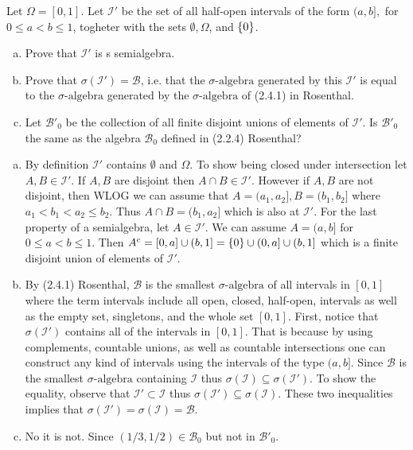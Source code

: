 \begin{problem}
	Let $ \Omega = [0,1] $. Let $ \mathcal{I}' $ be the set of all half-open intervals of the form $ (a,b], $ for $ 0\leq a < b \leq 1 $, togheter with the sets $ \emptyset, \Omega $, and $ \{0\} $.
	\begin{enumerate}[(a)]
		\item Prove that $ \mathcal{I}' $ is s semialgebra. 
		\item Prove that $ \sigma(\mathcal{I}') = \mathcal{B} $, i.e. that the $\sigma\text{-algebra}$ generated by this $ \mathcal{I}' $ is equal to the $\sigma\text{-algebra}$ generated by the $\sigma\text{-algebra}$ of (2.4.1) in Rosenthal.
		\item Let $ \mathcal{B}'_0 $ be the collection of all finite disjoint unions of elements of $ \mathcal{I}' $. Is $ \mathcal{B}'_0 $ the same as the algebra $ \mathcal{B}_0 $ defined in (2.2.4) Rosenthal?
	\end{enumerate}
\end{problem}
\begin{solution}
	\begin{enumerate}[(a)]
		\item By definition $ \mathcal{I}' $ contains $ \emptyset $ and $ \Omega $. To show being closed under intersection let $ A, B \in \mathcal{I}' $. If $ A,B $  are disjoint then $ A\cap B \in \mathcal{I'} $. However if $ A,B $ are not disjoint, then WLOG we can assume that $ A=(a_1,a_2], B = (b_1,b_2] $ where $ a_1 < b_1 < a_2 \leq b_2 $. Thus $ A\cap B = (b_1,a_2] $ which is also at $ \mathcal{I'} $. For the last property of a semialgebra, let $ A \in \mathcal{I'} $. We can assume $ A = (a,b] $ for $ 0\leq a<b \leq 1 $. Then $ A^c = [0,a] \cup (b,1] = \{0\}\cup (0,a] \cup (b,1] $ which is a finite disjoint union of elements of $ \mathcal{I'} $.
		\item By (2.4.1) Rosenthal, $ \mathcal{B} $ is the smallest $\sigma\text{-algebra}$ of all intervals in $ [0,1] $ where the term intervals include all open, closed, half-open, intervals as well as the empty set, singletons, and the whole set $ [0,1] $. First, notice that $ \sigma(\mathcal{I'}) $ contains all of the intervals in $ [0,1] $. That is because by using complements, countable unions, as well as countable intersections one can construct any kind of intervals using the intervals of the type $ (a,b] $. Since $ \mathcal{B} $ is the smallest $\sigma\text{-algebra}$ containing $ \mathcal{I} $ thus $ \sigma(\mathcal{I})\subseteq \sigma(\mathcal{I}') $. To show the equality,  observe that $ \mathcal{I'} \subset \mathcal{I} $ thus $ \sigma(\mathcal{I'}) \subseteq \sigma(\mathcal{I}) $. These two inequalities implies that $ \sigma(\mathcal{I'}) = \sigma(\mathcal{I}) = \mathcal{B}$. 
		\item No it is not. Since $ (1/3,1/2) \in \mathcal{B}_0 $ but not in $ \mathcal{B'}_0 $.
	\end{enumerate}
\end{solution}

